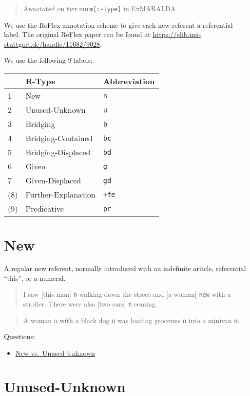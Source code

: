 \documentclass[
]{book}
\providecommand{\tightlist}{%
  \setlength{\itemsep}{0pt}\setlength{\parskip}{0pt}}
\begin{document}
\begin{quote}
Annotated on tier \texttt{norm{[}r-type{]}} in ExMARALDA
\end{quote}

We use the ReFlex annotation scheme to give each new referent a referential label.
The original ReFlex paper can be found at \url{https://elib.uni-stuttgart.de/handle/11682/9028}.

We use the following 9 labels:

\begin{longtable}[]{@{}lll@{}}
\toprule
& R-Type & Abbreviation\tabularnewline
\midrule
\endhead
1 & New & \texttt{n}\tabularnewline
2 & Unused-Unknown & \texttt{u}\tabularnewline
3 & Bridging & \texttt{b}\tabularnewline
4 & Bridging-Contained & \texttt{bc}\tabularnewline
5 & Bridging-Displaced & \texttt{bd}\tabularnewline
6 & Given & \texttt{g}\tabularnewline
7 & Given-Displaced & \texttt{gd}\tabularnewline
(8) & Further-Explanation & \texttt{+fe}\tabularnewline
(9) & Predicative & \texttt{pr}\tabularnewline
\bottomrule
\end{longtable}

\hypertarget{new}{%
\section{New}\label{new}}

A regular new referent, normally introduced with an indefinite article, referential ``this'', or a numeral.

\begin{quote}
I saw {[}this man{]} \texttt{n} walking down the street and {[}a woman{]} \texttt{new} with a stroller.
There were also {[}two cars{]} \texttt{n} coming.
\end{quote}

\begin{quote}
A woman \texttt{n} with a black dog \texttt{n} was loading groceries \texttt{n} into a minivan \texttt{n}.
\end{quote}

Questions:

\begin{itemize}
\tightlist
\item
  \protect\hyperlink{new-vs.-unused-unknown}{New vs.~Unused-Unknown}
\end{itemize}

\hypertarget{unused-unknown}{%
\section{Unused-Unknown}\label{unused-unknown}}
\end{document}
